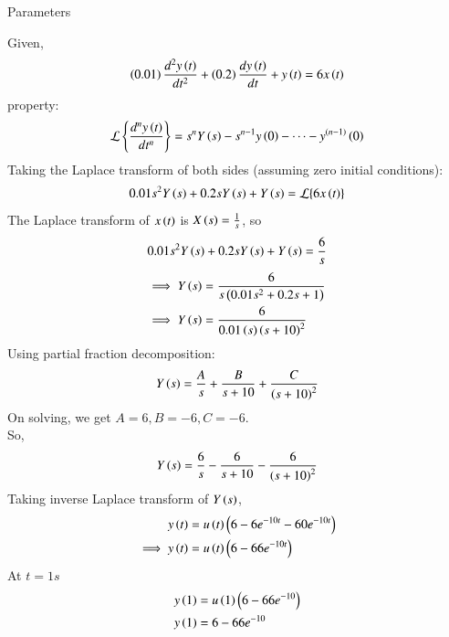 \documentclass[journal,12pt,twocolumn]{IEEEtran}
\theoremstyle{remark}
\begin{document}
\solution
\begin{table}[h!]
\centering

\vspace{0.5cm}
\caption{\normalsize Parameters}
\end{table}
    Given,
    \begin{align}
         \left(0.01\right) \frac{d^2y\left(t\right)}{dt^2} + \left(0.2\right)\frac{dy\left(t\right) }{dt} + y\left(t\right) = 6x\left(t\right)
    \end{align}
    property:
    \begin{align}
        \mathcal{L}\left\{\frac{d^n y\left(t\right)}{dt^n}\right\} = s^n Y\left(s\right) - s^{n-1} y\left(0\right) - \dots - y^{\left(n-1\right)}\left(0\right)
    \end{align}
    Taking the Laplace transform of both sides (assuming zero initial conditions):
    \begin{align}
        0.01s^2Y\left(s\right) + 0.2sY\left(s\right) + Y\left(s\right) = \mathcal{L}\{6x\left(t\right)\}
    \end{align}
    The Laplace transform of $x\left(t\right)$ is $X\left(s\right) = \frac{1}{s}$, so 
    \begin{align}
        0.01s^2Y\left(s\right) + 0.2sY\left(s\right) + Y\left(s\right) = \frac{6}{s}
    \end{align}
    \begin{align}
        \implies Y\left(s\right) &= \frac{6}{s\left(0.01s^2 + 0.2s + 1\right)}\\
        \implies Y\left(s\right) &= \frac{6}{ 0.01\left(s\right) \left(s + 10\right)^2}
    \end{align}
    Using partial fraction decomposition:
    \begin{align}
    Y\left(s\right) = \frac{A}{s} + \frac{B}{s + 10} + \frac{C}{\left(s + 10\right)^2}
    \end{align}
    On solving, we get $A=6,B=-6,C=-6$.\\
    So,\begin{align}
        Y\left(s\right) = \frac{6}{s} - \frac{6}{s + 10} - \frac{6}{\left(s + 10\right)^2}
    \end{align}
    Taking inverse Laplace transform of $Y\left(s\right)$,
    \begin{align}
        y\left(t\right) &= u\left(t\right) \left(6-6e^{-10t}-60e^{-10t}\right)\\
        \implies y \left(t\right) &=u \left(t\right) \left(6-66e^{-10t}\right)
    \end{align}
    At $t=1s$ 
    \begin{align}
        y\left(1\right) &=u\left(1\right) \left(6-66e^{-10}\right)\\
        y\left(1\right) &=6-66e^{-10}
    \end{align}
\end{document}
